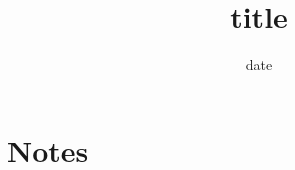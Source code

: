 \documentclass[11pt]{article}
\title{{{title}}}
\author{}
\date{{{date}}}
\begin{document}
\maketitle

\section{Notes}


\end{document}
